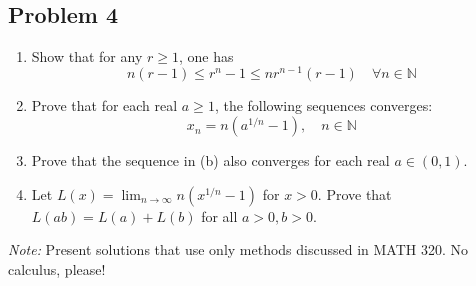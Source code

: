 \documentclass{article}
\newcommand{\N}{{\mathbb N}}
\begin{document}
\clearpage
~\clearpage

\subsection*{Problem 4}
{\it \begin{enumerate}
	\item Show that for any $r \geq 1$, one has
		\[
			n(r-1) \leq r^n - 1 \leq nr^{n-1}(r-1) \quad \forall n \in \N
		\]
	\item Prove that for each real $a \geq 1$, the following sequences converges:
		\[
			x_n = n\left(a^{1/n} - 1\right), \quad n \in \N
		\]
	\item Prove that the sequence in (b) also converges for each real $a \in (0,1)$.
	\item Let $L(x) = \lim_{n\to\infty} n\left(x^{1/n}-1\right)$ for $x > 0$.
		Prove that $L(ab) = L(a) + L(b)$ for all $a > 0, b > 0$.
\end{enumerate}
\emph{Note:} Present solutions that use only methods discussed in MATH 320.
No calculus, please!}
\end{document}
